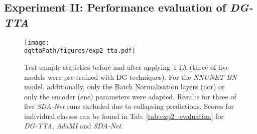     \subsection{Experiment II: Performance evaluation of \emph{DG-TTA}}
        \label{sec:exp2_tatta_results}
        \begin{figure*}
            \centerline{\texttt{[image: \\dgttaPath/figures/exp2\_tta.pdf]}}
            \caption{Test sample statistics before and after applying TTA (three of five models were pre-trained with DG techniques). For the \emph{NNUNET BN} model, additionally, only the Batch Normalisation layers (nor) or only the encoder (enc) parameters were adapted. Results for three of five \emph{SDA-Net} runs excluded due to collapsing predictions. Scores for individual classes can be found in Tab. \ref{tab:exp2_evaluation} for \emph{DG-TTA}, \emph{AdaMI} and \emph{SDA-Net}. \bplotdescription}
            \label{fig:exp2_tta}
        \end{figure*}


